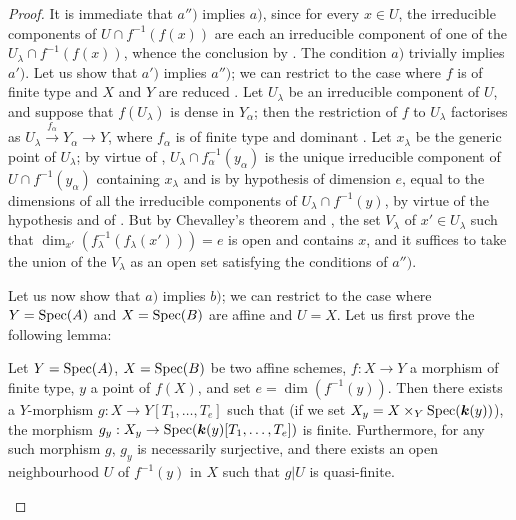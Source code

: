 \begin{proof}
It is immediate that $a'')$ implies $a)$, since for every $x\in U$, the irreducible components of $U\cap f^{-1}(f(x))$ are each an irreducible component of one of the $U_\lambda\cap f^{-1}(f(x))$, whence the conclusion by .
The condition $a)$ trivially implies $a')$.
Let us show that $a')$ implies $a'')$; we can restrict to the case where $f$ is of finite type and $X$ and $Y$ are reduced .
Let $U_\lambda$ be an irreducible component of $U$, and suppose that $f(U_\lambda)$ is dense in $Y_\alpha$; then the restriction of $f$ to $U_\lambda$ factorises as $U_\lambda\xrightarrow{f_\alpha}Y_\alpha\longrightarrow Y$, where $f_\alpha$ is of finite type and dominant .
Let $x_\lambda$ be the generic point of $U_\lambda$; by virtue of , $U_\lambda\cap f_\alpha^{-1}(y_\alpha)$ is the unique irreducible component of $U\cap f^{-1}(y_\alpha)$ containing $x_\lambda$ and is by hypothesis of dimension $e$, equal to the dimensions of all the irreducible components of $U_\lambda\cap f^{-1}(y)$, by virtue of the hypothesis and of .
But by Chevalley's theorem  and , the set $V_\lambda$ of $x'\in U_\lambda$ such that $\dim_{x'}(f_\lambda^{-1}(f_\lambda(x')))=e$ is open and contains $x$, and it suffices to take the union of the $V_\lambda$ as an open set satisfying the conditions of $a'')$.

Let us now show that $a)$ implies $b)$; we can restrict to the case where $Y=\operatorname{Spec}(A)$ and $X=\operatorname{Spec}(B)$ are affine and $U=X$.
Let us first prove the following lemma:

\begin{lemma}[13.3.1.1]
\label{IV.13.3.1.1}
Let $Y=\operatorname{Spec}(A)$, $X=\operatorname{Spec}(B)$ be two affine schemes, $f:X\to Y$ a morphism of finite type, $y$ a point of $f(X)$, and set $e=\dim(f^{-1}(y))$.
Then there exists a $Y$-morphism $g:X\to Y[T_1,\ldots,T_e]$ such that (if we set $X_y=X\times_Y\operatorname{Spec}(\boldsymbol{k}(y))$), the morphism $g_y:X_y\to\operatorname{Spec}(\boldsymbol{k}(y)[T_1,\ldots,T_e])$ is finite.
Furthermore, for any such morphism $g$, $g_y$ is necessarily surjective, and there exists an open neighbourhood $U$ of $f^{-1}(y)$ in $X$ such that $g|U$ is quasi-finite.
\end{lemma}


\end{proof}
